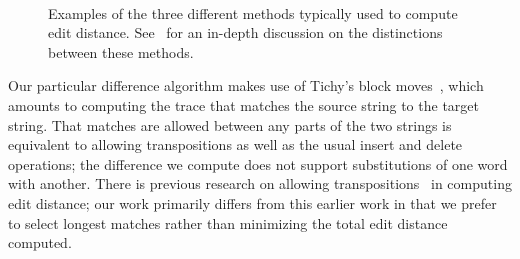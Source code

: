 \begin{figure}[htbp]
\centering
  \hspace{2ex}
  \\
\caption[Examples of three different styles for computing edit distance]{
  Examples of the three different methods typically used to compute
  edit distance.  See~\cite{Sankoff1999} for an in-depth discussion
  on the distinctions between these methods.
  \label{fig:trace-alignment-listing}
}
\end{figure}

Our particular difference algorithm makes use of
Tichy's block moves~\cite{Tichy1984}, which amounts to computing
the trace that matches the source string to the target string.
That matches are allowed between any parts of the two strings
is equivalent to allowing transpositions as well as the usual
insert and delete operations; the difference we compute does not support
substitutions of one word with another.
There is previous research on allowing
transpositions~\cite{Lowrance1975,Wagner1975,Sankoff1999} in
computing edit distance; our work primarily differs from this
earlier work in that we prefer to select longest matches rather
than minimizing the total edit distance computed.

